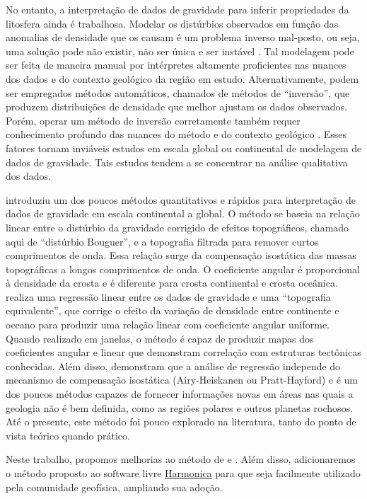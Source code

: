 \documentclass[onecolumn,a4paper,11pt]{article}
\begin{document}
No entanto, a interpretação de dados de gravidade para inferir propriedades da litosfera ainda é trabalhosa. Modelar os distúrbios observados em função das anomalias de densidade que os causam é um problema inverso mal-posto, ou seja, uma solução pode não existir, não ser única e ser instável \citep{Silva2001}. Tal modelagem pode ser feita de maneira manual por intérpretes altamente proficientes nas nuances dos dados e do contexto geológico da região em estudo. Alternativamente, podem ser empregados métodos automáticos, chamados de métodos de ``inversão'', que produzem distribuições de densidade que melhor ajustam os dados observados. Porém, operar um método de inversão corretamente também requer conhecimento profundo das nuances do método e do contexto geológico \citep{Silva2001}. Esses fatores tornam inviáveis estudos em escala global ou continental de modelagem de dados de gravidade. Tais estudos tendem a se concentrar na análise qualitativa dos dados.

\citet{Braitenberg2015} introduziu um dos poucos métodos quantitativos e rápidos para interpretação de dados de gravidade em escala continental a global. O método se baseia na relação linear entre o distúrbio da gravidade corrigido de efeitos topográficos, chamado aqui de ``distúrbio Bouguer'', e a topografia filtrada para remover curtos comprimentos de onda. Essa relação surge da compensação isostática das massas topográficas a longos comprimentos de onda. O coeficiente angular é proporcional à densidade da crosta e é diferente para crosta continental e crosta oceânica. \citet{Braitenberg2015} realiza uma regressão linear entre os dados de gravidade e uma ``topografia equivalente'', que corrige o efeito da variação de densidade entre continente e oceano para produzir uma relação linear com coeficiente angular uniforme. Quando realizado em janelas, o método é capaz de produzir mapas dos coeficientes angular e linear que demonstram correlação com estruturas tectônicas conhecidas. Além disso, \citet{Pivetta2020} demonstram que a análise de regressão independe do mecanismo de compensação isostática (Airy-Heiskanen ou Pratt-Hayford) e é um dos poucos métodos capazes de fornecer informações novas em áreas nas quais a geologia não é bem definida, como as regiões polares e outros planetas rochosos. Até o presente, este método foi pouco explorado na literatura, tanto do ponto de vista teórico quando prático.

Neste trabalho, propomos melhorias ao método de \citet{Braitenberg2015} e \citet{Pivetta2020}. Além disso, adicionaremos o método proposto ao software livre \href{https://www.fatiando.org/harmonica}{Harmonica} \citep{Harmonica} para que seja facilmente utilizado pela comunidade geofísica, ampliando sua adoção.
\end{document}
